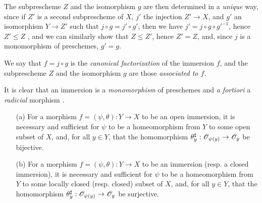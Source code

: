 The subprescheme $Z$ and the isomorphism $g$ are then determined in a \emph{unique} way, since if $Z'$ is a second subprescheme of $X$, $j'$ the injection $Z'\to X$, and $g'$ an isomorphism $Y\to Z'$ such that $j\circ g=j'\circ g'$, then we have $j'=j\circ g\circ{g'}^{-1}$, hence $Z'\leq Z$ , and we can similarly show that $Z\leq Z'$, hence $Z'=Z$, and, since $j$ is a monomorphism of preschemes, $g'=g$.

We say that $f=j\circ g$ is the \emph{canonical factorization} of the immersion $f$, and the subprescheme $Z$ and the isomorphism $g$ are those \emph{associated to $f$}.

It is clear that an immersion is a \emph{monomorphism} of preschemes  and \emph{a fortiori} a \emph{radicial} morphism .

\begin{proposition}[4.2.2]
\label{I.4.2.2}
\medskip\noindent
\begin{enumerate}
  \item[{\rm(a)}] For a morphism $f=(\psi,\theta):Y\to X$ to be an open immersion, it is necessary and sufficient for $\psi$ to be a homeomorphism from $Y$ to some open subset of $X$, and, for all $y\in Y$, that the homomorphism $\theta_y^\sharp:\sh{O}_{\psi(y)}\to\sh{O}_y$ be bijective.
  \item[{\rm(b)}] For a morphism $f=(\psi,\theta):Y\to X$ to be an immersion (resp. a closed immersion), it is necessary and sufficient for $\psi$ to be a homeomorphism from $Y$ to some locally closed (resp. closed) subset of $X$, and, for all $y\in Y$, that the homomorphism $\theta_y^\sharp:\sh{O}_{\psi(y)}\to\sh{O}_y$ be surjective.
\end{enumerate}
\end{proposition}

